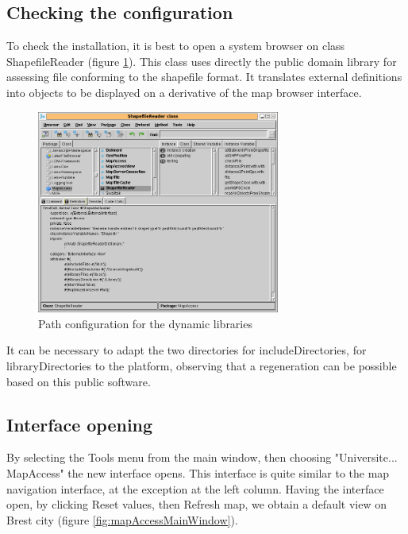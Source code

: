 \subsection{Checking the configuration}

To check the installation, it is best to open a system browser on class 
ShapefileReader (figure \ref{fig:configBrowserShp}). 
This class uses directly the public domain library 
for assessing file conforming to the shapefile format. 
It translates external definitions into objects to be displayed 
on a derivative of the map browser interface. 

\begin{figure}
\begin{center}
\includegraphics[width=8cm]{config-browser-shp.png}
\caption{Path configuration for the dynamic libraries}
\label{fig:configBrowserShp}
\end{center}
\end{figure}

It can be necessary to adapt the two directories for includeDirectories, 
for libraryDirectories to the platform, observing that a regeneration can be 
possible based on this public software. 


\subsection{Interface opening}
By selecting the Tools menu from the main window, then choosing "Universite... MapAccess"
the new interface opens. This interface is quite similar to the map navigation interface, at 
the exception at the left column. Having the interface open, by clicking 
Reset values, then Refresh map, we obtain a default view on Brest city 
(figure \ref{fig:mapAccessMainWindow}). 

